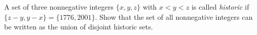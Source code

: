 A set of three nonnegative integers $\{x, y, z\}$ with $x < y < z$ is called \emph{historic} if $\{z - y, y - x\} = \{1776, 2001\}$. Show that the set of all nonnegative integers can be written as the union of disjoint historic sets.
